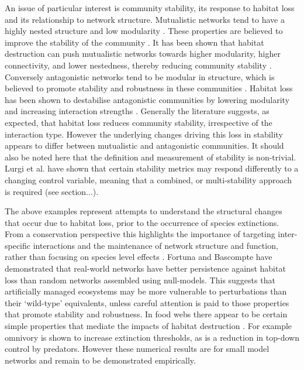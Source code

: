 \documentclass[12pt]{article}
\begin{document}
An issue of particular interest is community stability, its response to habitat loss and its relationship to network structure. Mutualistic networks tend to have a highly nested structure and low modularity \cite{bascompte2007plant}. These properties are believed to improve the stability of the community \cite{thebault2010stability}. It has been shown that habitat destruction can push mutualistic networks towards higher modularity, higher connectivity, and lower nestedness, thereby reducing community stability \cite{spiesman2013habitat, hagen2012biodiversity}. Conversely antagonistic networks tend to be modular in structure, which is believed to promote stability and robustness in these communities \cite{thebault2010stability}. Habitat loss has been shown to destabilise antagonistic communities by lowering modularity and increasing interaction strengths \cite{hagen2012biodiversity}. Generally the literature suggests, as expected, that habitat loss reduces community stability, irrespective of the interaction type. However the underlying changes driving this loss in stability appears to differ between mutualistic and antagonistic communities. It should also be noted here that the definition and measurement of stability is non-trivial. Lurgi et al. \cite{lurgi2015effects} have shown that certain stability metrics may respond differently to a changing control variable, meaning that a combined, or multi-stability approach is required (see section...).


The above examples represent attempts to understand the structural changes that occur due to habitat loss, prior to the occurrence of species extinctions. From a conservation perspective this highlights the importance of targeting inter-specific interactions and the maintenance of network structure and function, rather than focusing on species level effects \cite{memmott2007conservation}. Fortuna and Bascompte \cite{fortuna2006habitat} have demonstrated that real-world networks have better persistence against habitat loss than random networks assembled using null-models. This suggests that artificially managed ecosystems may be more vulnerable to perturbations than their `wild-type' equivalents, unless careful attention is paid to those properties that promote stability and robustness. In food webs there appear to be certain simple properties that mediate the impacts of habitat destruction \cite{melian2002food}. For example omnivory is shown to increase extinction thresholds, as is a reduction in top-down control by predators. However these numerical results are for small model networks and remain to be demonstrated empirically.     
\end{document}
